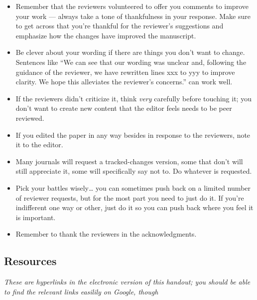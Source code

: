 \documentclass[11pt,]{article}
\begin{document}
\begin{itemize}
\itemsep1pt\parskip0pt
\item
  Remember that the reviewers volunteered to offer you comments to
  improve your work --- always take a tone of thankfulness in your
  response. Make sure to get across that you're thankful for the
  reviewer's suggestions and emphasize how the changes have improved the
  manuscript.
\item
  Be clever about your wording if there are things you don't want to
  change. Sentences like ``We can see that our wording was unclear and,
  following the guidance of the reviewer, we have rewritten lines xxx to
  yyy to improve clarity. We hope this alleviates the reviewer's
  concerns.'' can work well.
\item
  If the reviewers didn't criticize it, think \emph{very} carefully
  before touching it; you don't want to create new content that the
  editor feels needs to be peer reviewed.
\item
  If you edited the paper in any way besides in response to the
  reviewers, note it to the editor.
\item
  Many journals will request a tracked-changes version, some that don't
  will still appreciate it, some will specifically say not to. Do
  whatever is requested.
\item
  Pick your battles wisely\ldots{} you can sometimes push back on a
  limited number of reviewer requests, but for the most part you need to
  just do it. If you're indifferent one way or other, just do it so you
  can push back where you feel it is important. \bigskip{}
\item
  Remember to thank the reviewers in the acknowledgments.
\end{itemize}

\subsection{Resources}\label{resources}

\emph{These are hyperlinks in the electronic version of this handout;
you should be able to find the relevant links easilily on Google, though
}
\end{document}

